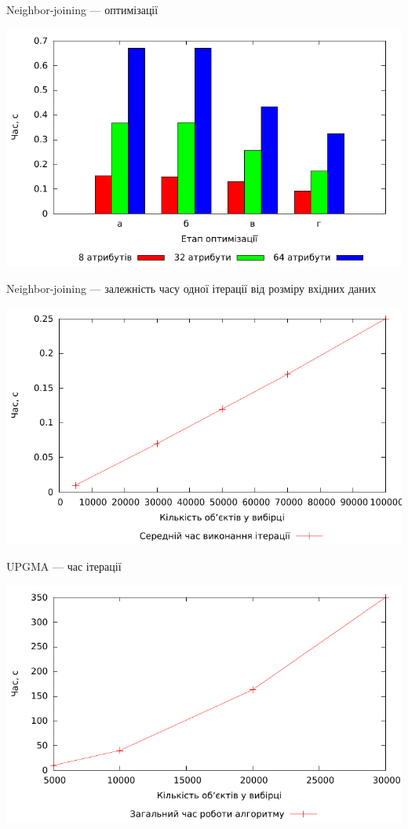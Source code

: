 \documentclass{beamer}
\begin{document}
        
    \begin{frame}{Neighbor-joining --- оптимізації}
        \begin{center}
            \includegraphics[scale=0.8]{nj_compare.pdf}
        \end{center}
    \end{frame}
    
    \begin{frame}{Neighbor-joining --- залежність часу одної ітерації від розміру вхідних даних}
        \begin{center}
            \includegraphics[scale=0.8]{nj_complexity.pdf}
        \end{center}
    \end{frame}
    
    
    \begin{frame}{UPGMA --- час ітерації}
        \begin{center}
            \includegraphics[scale=0.8]{upgma_real_complexity.pdf}
        \end{center}
    \end{frame}
    
\end{document}
